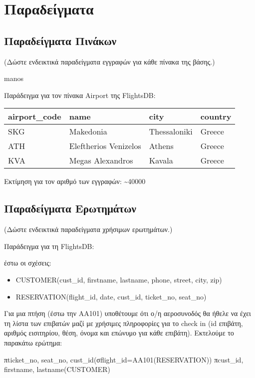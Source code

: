 ﻿\section{Παραδείγματα}

\subsection{Παραδείγματα Πινάκων}

(Δώστε ενδεικτικά παραδείγματα εγγραφών για κάθε πίνακα της βάσης.)


manos 

Παράδειγμα για τον πίνακα Airport της FlightsDB:

\begin{tabular}{|p{3cm}|p{4cm}|p{3cm}|p{3cm}|}
  \hline
  airport\_code & name & city & country \\ \hline
  SKG & Makedonia & Thessaloniki & Greece \\ \hline
  ATH & Eleftherios Venizelos & Athens & Greece \\ \hline
  KVA & Megas Alexandros & Kavala & Greece \\ \hline
\end{tabular}
  
Εκτίμηση για τον αριθμό των εγγραφών: \textasciitilde 40000

\subsection{Παραδείγματα Ερωτημάτων}

(Δώστε ενδεικτικά παραδείγματα χρήσιμων ερωτημάτων.)

Παράδειγμα για τη FlightsDB:

έστω οι σχέσεις:

\begin{itemize}[noitemsep]
\item CUSTOMER(cust\_id, firstname, lastname, phone, street, city,
  zip)
\item RESERVATION(flight\_id, date, cust\_id, ticket\_no, seat\_no)
\end{itemize}

Για μια πτήση (έστω την AA101) υποθέτουμε ότι ο/η αεροσυνοδός θα ήθελε
να έχει τη λίστα των επιβατών μαζί με χρήσιμες πληροφορίες για το
check in (id επιβάτη, αριθμός εισιτηρίου, θέση, όνομα και επώνυμο για
κάθε επιβάτη). Εκτελούμε το παρακάτω ερώτημα:

πticket\_no, seat\_no, cust\_id(σflight\_id=AA101(RESERVATION))
πcust\_id, firstname, lastname(CUSTOMER)


